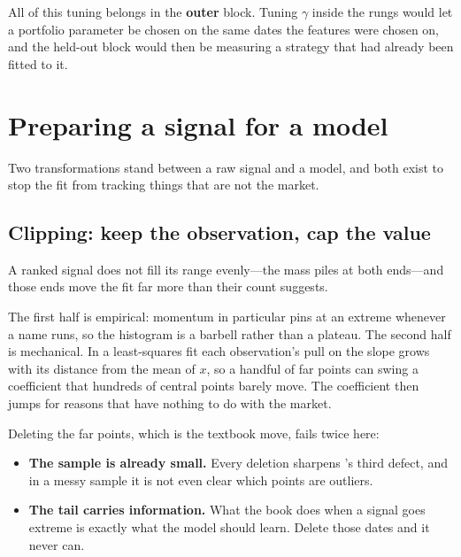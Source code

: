 \begin{note}
All of this tuning belongs in the \textbf{outer} block. Tuning $\gamma$ inside the rungs would let
a portfolio parameter be chosen on the same dates the features were chosen on, and the held-out
block would then be measuring a strategy that had already been fitted to it.
\end{note}


\section{Preparing a signal for a model}\label{sec:preparing}

Two transformations stand between a raw signal and a model, and both exist to stop the fit from
tracking things that are not the market.

\subsection{Clipping: keep the observation, cap the value}\label{sec:clipping}

\begin{claim}\label{clm:barbell}
A ranked signal does not fill its range evenly---the mass piles at both ends---and those ends move
the fit far more than their count suggests.
\end{claim}

The first half is empirical: momentum in particular pins at an extreme whenever a name runs, so
the histogram is a barbell rather than a plateau. The second half is mechanical. In a
least-squares fit each observation's pull on the slope grows with its distance from the mean of
$x$, so a handful of far points can swing a coefficient that hundreds of central points barely
move. The coefficient then jumps for reasons that have nothing to do with the market.


Deleting the far points, which is the textbook move, fails twice here:

\begin{itemize}
  \item \textbf{The sample is already small.} Every deletion sharpens 's
        third defect, and in a messy sample it is not even clear which points are outliers.
  \item \textbf{The tail carries information.} What the book does when a signal goes extreme is
        exactly what the model should learn. Delete those dates and it never can.
\end{itemize}


